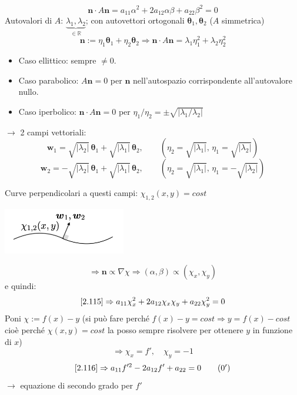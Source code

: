 \documentclass[a4paper,11pt]{report}
\newcommand{\vect}[1]{\boldsymbol{#1}}
\newcommand{\R}{\mathbb{R}}
\begin{document}
\begin{equation}
\vect{n}\cdot A\vect{n}=a_{11}\alpha^2+2a_{12}\alpha\beta + a_{22}\beta^2=0
\label{2.115}
\end{equation}
Autovalori di $A$: $\underbrace{\lambda_1,\lambda_2}_{\in\R}$; con autovettori ortogonali $\vect{\theta}_1,\vect{\theta}_2$ ($A$ simmetrica)
\[
\vect{n}:= \eta_1 \vect{\theta}_1 + \eta_2\vect{\theta}_2 \Rightarrow \vect{n}\cdot A \vect{n}=\lambda_1\eta_1^2 + \lambda_2\eta_2^2
\]
\begin{itemize}
\item Caso ellittico: sempre $\neq 0$.
\item Caso parabolico: $A\vect{n}=0$ per $\vect{n}$ nell'autospazio corrispondente all'autovalore nullo.
\item Caso iperbolico: $\vect{n}\cdot A\vect{n} = 0$ per ${\eta_1}/{\eta_2}=\pm \sqrt{\left|{\lambda_1}/{\lambda_2}\right|}$
\end{itemize}
$\rightarrow$ 2 campi vettoriali:
\[
\vect{w}_1 = \sqrt{|\lambda_2|}\,\vect{\theta}_1 + \sqrt{|\lambda_1|}\,\vect{\theta}_2, \qquad (\eta_2=\sqrt{|\lambda_1|},\, \eta_1=\sqrt{|\lambda_2|})
\]
\[
\vect{w}_2 = -\sqrt{|\lambda_2|}\,\vect{\theta}_1 + \sqrt{|\lambda_1|}\,\vect{\theta}_2, \qquad (\eta_2=\sqrt{|\lambda_1|},\, \eta_1=-\sqrt{|\lambda_2|})
\]

Curve perpendicolari a questi campi: $\chi_{1,2}(x,y)=cost$
\begin{center}
\includegraphics[width=0.4\textwidth]{immagini/curva3}
\end{center}

\[
\Rightarrow \vect{n} \propto \nabla\chi \Rightarrow (\alpha,\beta) \propto (\chi_x, \chi_y)
\]
e quindi:
\begin{equation}
\eqref{2.115} \Rightarrow a_{11}\chi_x^2 + 2a_{12}\chi_x\chi_y + a_{22}\chi_y^2 =0
\label{2.116}
\end{equation}
Poni $\chi := f(x)-y$ (si pu\`o fare perch\'e $f(x)-y=cost \Rightarrow y=f(x) - cost$ cio\`e perch\'e $\chi(x,y)=cost$ la posso sempre risolvere per ottenere $y$ in funzione di $x$)
\[
\Rightarrow \chi_x = f', \quad \chi_y=-1
\]
\begin{equation}
\eqref{2.116}\Rightarrow a_{11}f'^2 - 2 a_{12}f' + a_{22}=0
\label{2.116'}
\tag{$\theequation^\prime$}
\end{equation}
$\rightarrow$ equazione di secondo grado per $f'$
\end{document}
